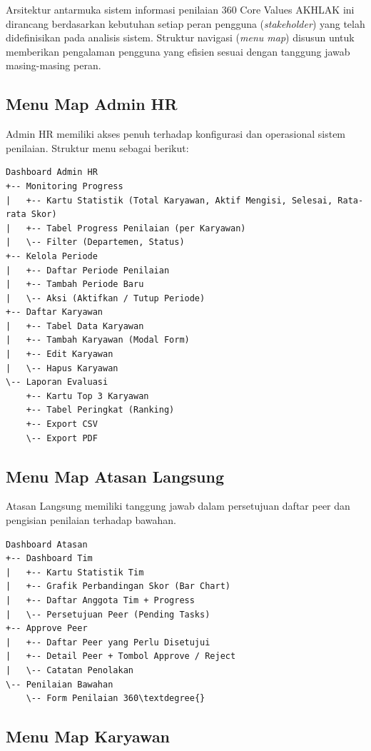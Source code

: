 \documentclass[12pt,a4paper,oneside]{report}
\begin{document}
Arsitektur antarmuka sistem informasi penilaian 360\textdegree{} Core Values AKHLAK ini dirancang berdasarkan kebutuhan setiap peran pengguna (\textit{stakeholder}) yang telah didefinisikan pada analisis sistem. Struktur navigasi (\textit{menu map}) disusun untuk memberikan pengalaman pengguna yang efisien sesuai dengan tanggung jawab masing-masing peran.

\subsection{Menu Map Admin HR}

Admin HR memiliki akses penuh terhadap konfigurasi dan operasional sistem penilaian. Struktur menu sebagai berikut:

\begin{verbatim}
Dashboard Admin HR
+-- Monitoring Progress
|   +-- Kartu Statistik (Total Karyawan, Aktif Mengisi, Selesai, Rata-rata Skor)
|   +-- Tabel Progress Penilaian (per Karyawan)
|   \-- Filter (Departemen, Status)
+-- Kelola Periode
|   +-- Daftar Periode Penilaian
|   +-- Tambah Periode Baru
|   \-- Aksi (Aktifkan / Tutup Periode)
+-- Daftar Karyawan
|   +-- Tabel Data Karyawan
|   +-- Tambah Karyawan (Modal Form)
|   +-- Edit Karyawan
|   \-- Hapus Karyawan
\-- Laporan Evaluasi
    +-- Kartu Top 3 Karyawan
    +-- Tabel Peringkat (Ranking)
    +-- Export CSV
    \-- Export PDF
\end{verbatim}

\subsection{Menu Map Atasan Langsung}

Atasan Langsung memiliki tanggung jawab dalam persetujuan daftar peer dan pengisian penilaian terhadap bawahan.

\begin{verbatim}
Dashboard Atasan
+-- Dashboard Tim
|   +-- Kartu Statistik Tim
|   +-- Grafik Perbandingan Skor (Bar Chart)
|   +-- Daftar Anggota Tim + Progress
|   \-- Persetujuan Peer (Pending Tasks)
+-- Approve Peer
|   +-- Daftar Peer yang Perlu Disetujui
|   +-- Detail Peer + Tombol Approve / Reject
|   \-- Catatan Penolakan
\-- Penilaian Bawahan
    \-- Form Penilaian 360\textdegree{}
\end{verbatim}

\subsection{Menu Map Karyawan}
\end{document}
